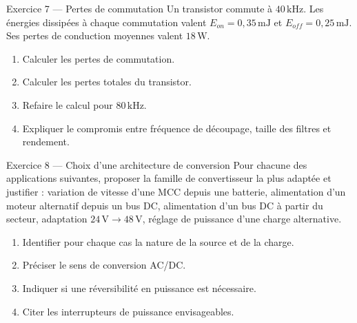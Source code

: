 \begin{TLExercise}{Exercice 7 — Pertes de commutation}
Un transistor commute à $40\,\mathrm{kHz}$. Les énergies dissipées à chaque
commutation valent $E_{on}=0{,}35\,\mathrm{mJ}$ et
$E_{off}=0{,}25\,\mathrm{mJ}$. Ses pertes de conduction moyennes valent $18\,\mathrm W$.
\begin{enumerate}
  \item Calculer les pertes de commutation.
  \item Calculer les pertes totales du transistor.
  \item Refaire le calcul pour $80\,\mathrm{kHz}$.
  \item Expliquer le compromis entre fréquence de découpage, taille des filtres et rendement.
\end{enumerate}
\end{TLExercise}

\begin{TLExercise}{Exercice 8 — Choix d'une architecture de conversion}
Pour chacune des applications suivantes, proposer la famille de convertisseur la
plus adaptée et justifier : variation de vitesse d'une MCC depuis une batterie,
alimentation d'un moteur alternatif depuis un bus DC, alimentation d'un bus DC
à partir du secteur, adaptation $24\,\mathrm V\to48\,\mathrm V$, réglage de puissance
d'une charge alternative.
\begin{enumerate}
  \item Identifier pour chaque cas la nature de la source et de la charge.
  \item Préciser le sens de conversion AC/DC.
  \item Indiquer si une réversibilité en puissance est nécessaire.
  \item Citer les interrupteurs de puissance envisageables.
\end{enumerate}
\end{TLExercise}
